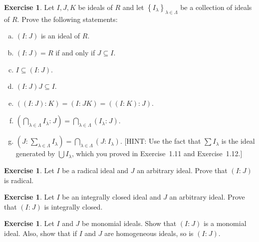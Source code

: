 \documentclass{amsart}
\theoremstyle{plain}
\theoremstyle{definition}
\newtheorem{exercise}[theorem]{Exercise}
\theoremstyle{definition}
\renewcommand{\colon}[3]{\ensuremath{\left(#1:_{#2} #3\right)}}
\begin{document}
\begin{exercise}\label{exer:colon}
Let $I, J, K$ be ideals of $R$
and let $\left\{ I_{\lambda} \right\}_{\lambda \in \Lambda}$ be a collection of ideals
of $R$. Prove the following statements:
\begin{enumerate}[a.]
\item \colon{I}{}{J} is an ideal of $R$.

\item $\colon{I}{}{J} = R$ if and only if $J \subseteq I$.

\item $I \subseteq \colon{I}{}{J}$.

\item $\colon{I}{}{J} J \subseteq I$.

\item $\colon{\colon{I}{}{J}}{}{K} = \colon{I}{}{JK} =
\colon{\colon{I}{}{K}}{}{J}$.

\item $\colon{\bigcap_{\lambda \in \Lambda} I_{\lambda}}{}{J} = \bigcap_{\lambda \in \Lambda}
\colon{I_{\lambda}}{}{J}$.

\item $\colon{J}{}{\sum_{\lambda \in \Lambda} I_{\lambda}} = \bigcap_{\lambda \in \Lambda}
\colon{J}{}{I_{\lambda}}$. [HINT: Use the fact that $\sum I_{\lambda}$ is the ideal generated by
$\bigcup I_{\lambda}$, which you proved in Exercise~1.11 and Exercise~1.12.]
\end{enumerate}
\end{exercise}


\begin{exercise}
Let $I$ be a radical ideal and $J$ an arbitrary ideal.
Prove that $\colon{I}{}{J}$ is radical.
\end{exercise}

\begin{exercise} %
Let $I$ be an integrally closed ideal and $J$ an arbitrary ideal.
Prove that $\colon{I}{}{J}$ is integrally closed.
\end{exercise}

\begin{exercise}
Let $I$ and $J$ be monomial ideals.
Show that $\colon{I}{}{J}$ is a monomial ideal.
Also, show that if $I$ and $J$ are homogeneous ideals, so is $\colon{I}{}{J}$.
\end{exercise}
\end{document}
